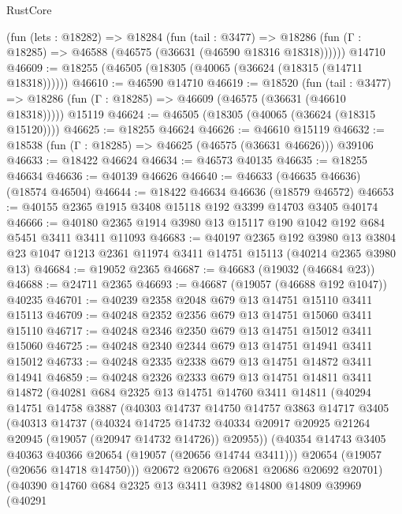 \begin{lexlean}{RustCore}
\begin{coremodule}
    (fun (lets : @18282) =>
    @18284
      (fun (tail : @3477) =>
      @18286 (fun (Γ : @18285) => @46588 (@46575 (@36631 (@46590 @18316 @18318))))))
    @14710
@46609 := @18255 (@46505 (@18305 (@40065 (@36624 (@18315 (@14711 @18318))))))
@46610 := @46590 @14710
@46619 := @18520
    (fun (tail : @3477) => @18286 (fun (Γ : @18285) => @46609 (@46575 (@36631 (@46610 @18318)))))
    @15119
@46624 := @46505 (@18305 (@40065 (@36624 (@18315 @15120))))
@46625 := @18255 @46624
@46626 := @46610 @15119
@46632 := @18538 (fun (Γ : @18285) => @46625 (@46575 (@36631 @46626))) @39106
@46633 := @18422 @46624
@46634 := @46573 @40135
@46635 := @18255 @46634
@46636 := @40139 @46626
@46640 := @46633 (@46635 @46636) (@18574 @46504)
@46644 := @18422 @46634 @46636 (@18579 @46572)
@46653 := @40155 @2365 @1915 @3408 @15118 @192 @3399 @14703 @3405 @40174
@46666 := @40180 @2365 @1914 @3980 @13 @15117 @190 @1042 @192 @684 @5451 @3411 @3411 @11093
@46683 := @40197
    @2365
    @192
    @3980
    @13
    @3804
    @23
    @1047
    @1213
    @2361
    @11974
    @3411
    @14751
    @15113
    (@40214 @2365 @3980 @13)
@46684 := @19052 @2365
@46687 := @46683 (@19032 (@46684 @23))
@46688 := @24711 @2365
@46693 := @46687 (@19057 (@46688 @192 @1047)) @40235
@46701 := @40239 @2358 @2048 @679 @13 @14751 @15110 @3411 @15113
@46709 := @40248 @2352 @2356 @679 @13 @14751 @15060 @3411 @15110
@46717 := @40248 @2346 @2350 @679 @13 @14751 @15012 @3411 @15060
@46725 := @40248 @2340 @2344 @679 @13 @14751 @14941 @3411 @15012
@46733 := @40248 @2335 @2338 @679 @13 @14751 @14872 @3411 @14941
@46859 := @40248
    @2326
    @2333
    @679
    @13
    @14751
    @14811
    @3411
    @14872
    (@40281
      @684
      @2325
      @13
      @14751
      @14760
      @3411
      @14811
      (@40294
        @14751
        @14758
        @3887
        (@40303
          @14737
          @14750
          @14757
          @3863
          @14717
          @3405
          (@40313
            @14737
            (@40324
              @14725
              @14732
              @40334
              @20917
              @20925
              @21264
              @20945
              (@19057 (@20947 @14732 @14726))
              @20955))
          (@40354 @14743 @3405 @40363 @40366 @20654 (@19057 (@20656 @14744 @3411)))
          @20654
          (@19057 (@20656 @14718 @14750)))
        @20672
        @20676
        @20681
        @20686
        @20692
        @20701)
      (@40390
        @14760
        @684
        @2325
        @13
        @3411
        @3982
        @14800
        @14809
        @39969
        (@40291

\end{coremodule}
\end{lexlean}
